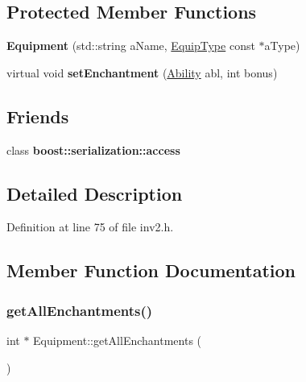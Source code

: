 \subsection*{Protected Member Functions}
\begin{DoxyCompactItemize}
\item 
\hypertarget{class_equipment_ab98d0ccbf2f89274a0c4aa9d4763e35c}{}\label{class_equipment_ab98d0ccbf2f89274a0c4aa9d4763e35c} 
{\bfseries Equipment} (std\+::string a\+Name, \hyperlink{class_equip_type}{Equip\+Type} const $\ast$a\+Type)
\item 
\hypertarget{class_equipment_ac6946f620ba8e13c3dfd039d4c604f09}{}\label{class_equipment_ac6946f620ba8e13c3dfd039d4c604f09} 
virtual void {\bfseries set\+Enchantment} (\hyperlink{class_ability}{Ability} abl, int bonus)
\end{DoxyCompactItemize}
\subsection*{Friends}
\begin{DoxyCompactItemize}
\item 
\hypertarget{class_equipment_ac98d07dd8f7b70e16ccb9a01abf56b9c}{}\label{class_equipment_ac98d07dd8f7b70e16ccb9a01abf56b9c} 
class {\bfseries boost\+::serialization\+::access}
\end{DoxyCompactItemize}


\subsection{Detailed Description}


Definition at line 75 of file inv2.\+h.



\subsection{Member Function Documentation}
\hypertarget{class_equipment_a9e2505f187dadc04a811a9d0680d29cf}{}\label{class_equipment_a9e2505f187dadc04a811a9d0680d29cf} 
\subsubsection{\texorpdfstring{get\+All\+Enchantments()}{getAllEnchantments()}}
{\footnotesize\ttfamily int $\ast$ Equipment\+::get\+All\+Enchantments (\begin{DoxyParamCaption}{ }\end{DoxyParamCaption})}



